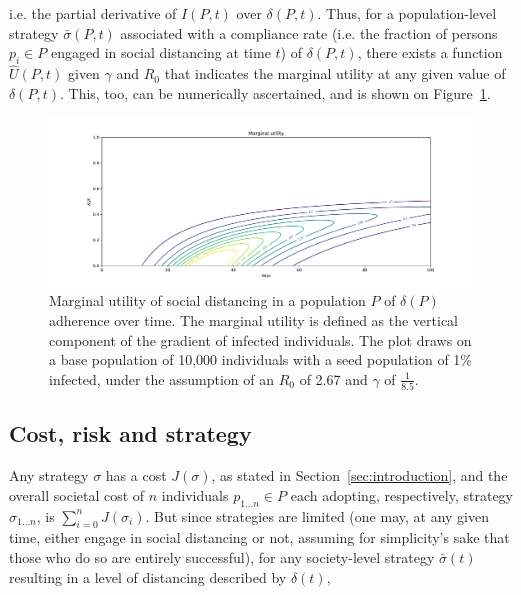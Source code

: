 \documentclass{article}
\begin{document}
\noindent i.e. the partial derivative of $I(P, t)$ over $\delta(P, t)$. Thus, for a population-level strategy $\bar{\sigma}(P, t)$ associated with a compliance rate (i.e. the fraction of persons $p_i \in P$ engaged in social distancing at time $t$) of $\delta(P, t)$, there exists a function $\hat{U}(P, t)$ given $\gamma$ and $R_0$ that indicates the marginal utility at any given value of $\delta(P, t)$. This, too, can be numerically ascertained, and is shown on Figure~\ref{fig:marginal_utility}.

\begin{figure}
	\includegraphics[width=\linewidth]{figures/marginal_utility}
	\caption{Marginal utility of social distancing in a population $P$ of $\delta(P)$ adherence over time. The marginal utility is defined as the vertical component of the gradient of infected individuals. The plot draws on a base population of 10,000 individuals with a seed population of 1\% infected, under the assumption of an $R_0$ of 2.67 and $\gamma$ of $\frac{1}{8.5}$.}
	\label{fig:marginal_utility}
\end{figure}


\subsection{Cost, risk and strategy} %
\label{sub:cost_risk_and_strategy}

Any strategy $\sigma$ has a cost $J(\sigma)$, as stated in Section~\ref{sec:introduction}, and the overall societal cost of $n$ individuals $p_{1 \ldots n} \in P$ each adopting, respectively, strategy $\sigma_{1 \ldots n}$, is $\sum_{i=0}^n J(\sigma_i)$. But since strategies are limited (one may, at any given time, either engage in social distancing or not, assuming for simplicity's sake that those who do so are entirely successful), for any society-level strategy $\bar{\sigma} (t)$ resulting in a level of distancing described by $\delta (t)$, 
\end{document}
